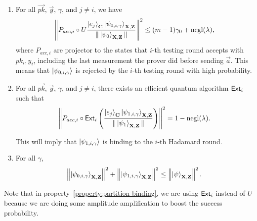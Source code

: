 \begin{lemma}
\begin{enumerate}
		\item \label{property:partition-testing}
			For all $\vec{pk}$, $\vec{y}$, $\gamma$, and  $j\neq i$, we have
			\begin{align}
				\left\lVert P_{acc, i} \circ U\frac{\ket{e_j}_{\mathbf{C}}\ket{\psi_{0,i,\gamma}}_{\mathbf{X},\mathbf{Z}}}{\|\ket{\psi_0}_{\mathbf{X},\mathbf{Z}}\|}\right\rVert^2 \leq (m-1)\gamma_0+\operatorname{negl}(\lambda),
			\end{align}
			where $P_{acc, i}$ are projector to the states that $i$-th testing round accepts with $pk_i,y_i$, including the last measurement the prover did before sending $\vec{a}$.  This means that $\ket{\psi_{0,i,\gamma}}$ is rejected by the $i$-th testing round with high probability.
		\item \label{property:partition-binding}
			For all $\vec{pk}$, $\vec{y}$, $\gamma$, and $j\neq i$, there exists an efficient quantum algorithm $\mathsf{Ext}_i$ such that
			\begin{align}
				\left\lVert P_{acc, i} \circ \mathsf{Ext}_i\left(\frac{\ket{e_j}_{\mathbf{C}}\ket{\psi_{1,i,\gamma}}_{\mathbf{X},\mathbf{Z}}}{\|\ket{\psi_1}_{\mathbf{X},\mathbf{Z}}\|}\right)\right\rVert^2 =1-\operatorname{negl}(\lambda).
			\end{align}

			This will imply that $\ket{\psi_{1,i,\gamma}}$ is binding to the $i$-th Hadamard round.

		\item \label{property-partition-norm-sum}
			For all $\gamma$,
			\begin{align}
				\left\lVert\ket{\psi_{0,i,\gamma}}_{\mathbf{X},\mathbf{Z}}\right\rVert^2+ \left\lVert\ket{\psi_{1,i,\gamma}}_{\mathbf{X},\mathbf{Z}}\right\rVert^2 \leq  \left\lVert\ket{\psi}_{\mathbf{X},\mathbf{Z}}\right\rVert^2.
			\end{align}
	\end{enumerate}
\end{lemma}

Note that in property~\ref{property:partition-binding}, we are using $\mathsf{Ext}_i$ instead of $U$ because we are doing some amplitude amplification to boost the success probability. 






